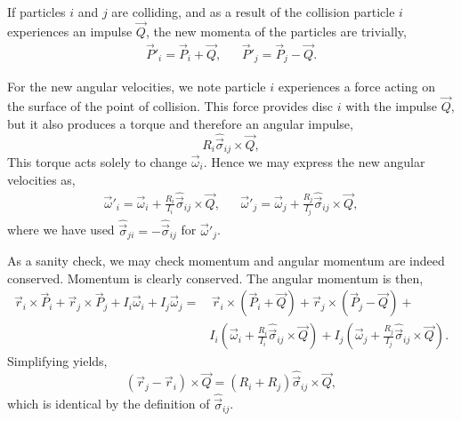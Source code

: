 \documentclass{article}
\begin{document}
If particles $i$ and $j$ are colliding, and as a result of the collision particle $i$ experiences an impulse $\vec{Q}$, the new momenta of the particles are trivially, 
\begin{align}
\label{eq:momenta-relations}
    \vec{P}'_i = \vec{P}_i + \vec{Q},
    &&
    \vec{P}'_j = \vec{P}_j - \vec{Q}.
\end{align}

For the new angular velocities, we note particle $i$ experiences a force acting on the surface of the point of collision. This force provides disc $i$ with the impulse $\vec{Q}$, but it also produces a torque and therefore an angular impulse,
\begin{equation}
    R_i \hat{\vec{\sigma}}_{ij} \times \vec{Q},
\end{equation}
This torque acts solely to change $\vec{\omega}_i$. Hence we may express the new angular velocities as,
\begin{align}
\label{eq:ang-velocity-relations}
    \vec{\omega}'_i = \vec{\omega}_i + \frac{R_i}{I_i} \hat{\vec{\sigma}}_{ij} \times \vec{Q},
    &&
    \vec{\omega}'_j = \vec{\omega}_j + \frac{R_j}{I_j} \hat{\vec{\sigma}}_{ij} \times \vec{Q},
\end{align}
where we have used $\hat{\vec{\sigma}}_{ji} = -\hat{\vec{\sigma}}_{ij}$ for $\vec{\omega}'_j$.

As a sanity check, we may check momentum and angular momentum are indeed conserved. Momentum is clearly conserved. The angular momentum is then,
\begin{align}
    \vec{r}_i \times \vec{P}_i + \vec{r}_j \times \vec{P}_j +
    I_i \vec{\omega}_i + I_j \vec{\omega}_j =& \,
    \vec{r}_i \times \left( \vec{P}_i + \vec{Q} \right) + 
    \vec{r}_j \times \left( \vec{P}_j - \vec{Q} \right) + \\
    & I_i \left( \vec{\omega}_i + \frac{R_i}{I_i} \hat{\vec{\sigma}}_{ij} \times \vec{Q} \right) +
    I_j \left( \vec{\omega}_j + \frac{R_j}{I_j} \hat{\vec{\sigma}}_{ij} \times \vec{Q} \right).
\end{align}
Simplifying yields,
\begin{equation}
    \left( \vec{r}_j - \vec{r}_i \right) \times \vec{Q}
    =
    \left( R_i + R_j \right) \hat{\vec{\sigma}}_{ij} \times \vec{Q},
\end{equation}
which is identical by the definition of $\hat{\vec{\sigma}}_{ij}$.
\end{document}
